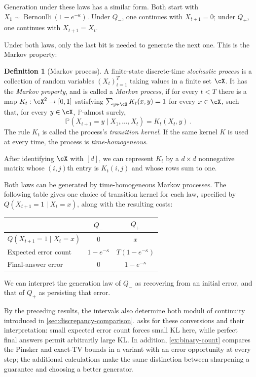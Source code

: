 \documentclass[11pt,twoside]{article}
\renewcommand{\P}{\mathbb P}
\theoremstyle{definition}
\newtheorem{definition}[theorem]{Definition}
\theoremstyle{remark}
\begin{document}
Generation under these laws has a similar form.
Both start with \(X_1\sim\operatorname{Bernoulli}(1-e^{-\kappa})\).
Under \(Q_-\), one continues with \(X_{t+1}=0\); under \(Q_+\),
one continues with \(X_{t+1}=X_t\).

Under both laws, only the last bit is needed to generate the next one.
This is the Markov property:

\begin{definition}[Markov process]
A finite-state discrete-time \emph{stochastic process}
is a collection of random variables $(X_t)_{t=1}^T$ taking values in a
finite set $\cX$. It has the \emph{Markov property}, and is called a
\emph{Markov process}, if for every $t<T$ there is a map
$K_t:\cX^2\to[0,1]$ satisfying
$\sum_{y\in\cX}K_t(x,y)=1$ for every $x\in\cX$, such that, for every
$y\in\cX$, $\P$-almost surely,
\[
  \P(X_{t+1}=y\mid X_1,\ldots,X_t)=K_t(X_t,y)\,.
\]
The rule \(K_t\) is called the process's \emph{transition kernel}.
If the same kernel \(K\) is used at every time, the process is
\emph{time-homogeneous}.
\end{definition}
After identifying $\cX$ with $[d]$, we can represent $K_t$ by a
$d\times d$ nonnegative matrix whose $(i,j)$th entry is $K_t(i,j)$
and whose rows sum to one.

Both laws can be generated by time-homogeneous Markov processes. The
following table gives one choice of transition kernel for each law,
specified by $Q(X_{t+1}=1\mid X_t=x)$, along with the resulting costs:
\begin{center}
\begin{tabular}{lcc}
\toprule
 & \(Q_-\) & \(Q_+\)\\
\midrule
\(Q(X_{t+1}=1\mid X_t=x)\) & \(0\) & \(x\)\\
Expected error count & \(1-e^{-\kappa}\) & \(T(1-e^{-\kappa})\)\\
Final-answer error & \(0\) & \(1-e^{-\kappa}\)\\
\bottomrule
\end{tabular}
\end{center}
We can interpret the generation law of $Q_-$ as recovering from an
initial error, and that of $Q_+$ as persisting that error.

By the preceding results, the intervals also determine both moduli of
continuity introduced in
\cref{sec:discrepancy-comparison}. 
asks for these conversions and their interpretation: small expected
error count forces small KL here, while perfect final answers permit
arbitrarily large KL.
In addition, \cref{ex:binary-count} compares the
Pinsker and exact-TV bounds in a variant with an error opportunity
at every step; the additional calculations make the same distinction
between sharpening a guarantee and choosing a better generator.
\end{document}
